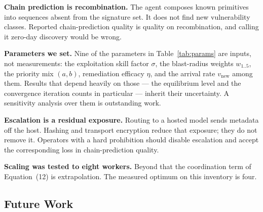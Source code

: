 \documentclass[journal]{IEEEtran}
\begin{document}
\textbf{Chain prediction is recombination.} The agent composes known
primitives into sequences absent from the signature set. It does not find new
vulnerability classes. Reported chain-prediction quality is quality on
recombination, and calling it zero-day discovery would be wrong.

\textbf{Parameters we set.} Nine of the parameters in Table~\ref{tab:params}
are inputs, not measurements: the exploitation skill factor $\sigma$, the
blast-radius weights $w_{1..5}$, the priority mix $(a,b)$, remediation
efficacy $\eta$, and the arrival rate $v_{\mathrm{new}}$ among them. Results
that depend heavily on those --- the equilibrium level and the convergence
iteration counts in particular --- inherit their uncertainty. A sensitivity
analysis over them is outstanding work.

\textbf{Escalation is a residual exposure.} Routing to a hosted model sends
metadata off the host. Hashing and transport encryption reduce that exposure;
they do not remove it. Operators with a hard prohibition should disable
escalation and accept the corresponding loss in chain-prediction quality.

\textbf{Scaling was tested to eight workers.} Beyond that the coordination
term of Equation~(12) is extrapolation. The measured optimum on this inventory
is four.

\subsection{Future Work}
\end{document}
